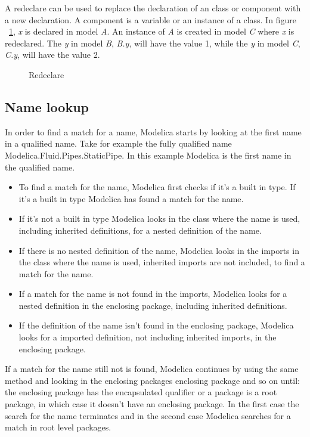 \documentclass{cslthse-msc}
\begin{document}
A redeclare can be used to replace the declaration of an class or component with a new declaration. A component is a variable or an instance of a class. In figure ~\ref{fig:redeclare}, \textit{x} is declared in model \textit{A}. An instance of \textit{A} is created in model \textit{C} where \textit{x} is redeclared. The \textit{y} in model \textit{B}, \textit{B.y}, will have the value 1, while the \textit{y} in model \textit{C}, \textit{C.y}, will have the value 2.

\begin{figure}[H]
	
    \caption{Redeclare}
    \label{fig:redeclare}
\end{figure}

\subsection{Name lookup}
In order to find a match for a name, Modelica starts by looking at the first name in a qualified name. Take for example the fully qualified name Modelica.Fluid.Pipes.StaticPipe. In this example Modelica is the first name in the qualified name.
\begin{itemize}
\item To find a match for the name, Modelica first checks if it's a built in type. If it's a built in type Modelica has found a match for the name.

\item If it's not a built in type Modelica looks in the class where the name is used, including inherited definitions, for a nested definition of the name. 

\item If there is no nested definition of the name, Modelica looks in the imports in the class where the name is used, inherited imports are not included, to find a match for the name.

\item If a match for the name is not found in the imports, Modelica looks for a nested definition in the enclosing package, including inherited definitions.

\item If the definition of the name isn't found in the enclosing package, Modelica looks for a imported definition, not including inherited imports, in the enclosing package.
\end{itemize}
If a match for the name still not is found, Modelica continues by using the same method and looking in the enclosing packages enclosing package and so on until: the enclosing package has the encapsulated qualifier or a package is a root package, in which case it doesn't have an enclosing package. In the first case the search for the name terminates and in the second case Modelica searches for a match in root level packages.
\end{document}
